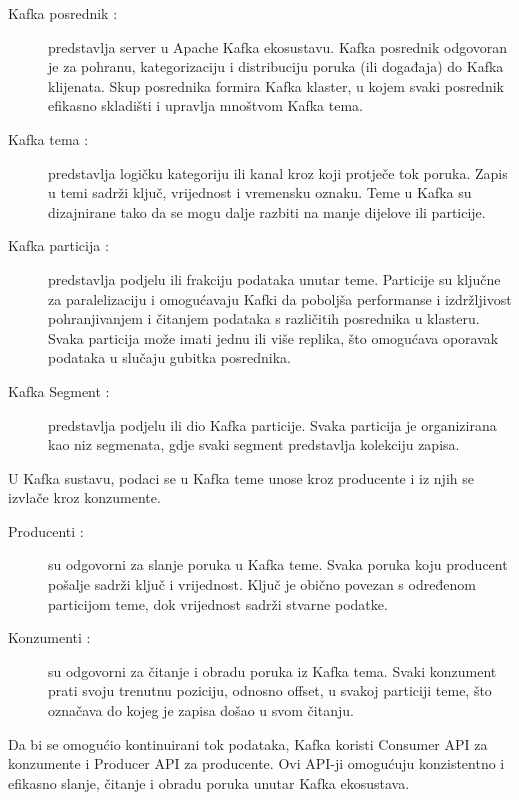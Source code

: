 \documentclass[times, utf8, diplomski]{fer}
\begin{document}
\begin{description}
	\item[Kafka posrednik  :] predstavlja server u Apache Kafka ekosustavu. Kafka posrednik odgovoran je za pohranu, kategorizaciju i distribuciju poruka (ili događaja) do Kafka klijenata. Skup posrednika formira Kafka klaster, u kojem svaki posrednik efikasno skladišti i upravlja mnoštvom Kafka tema.
	
	\item[Kafka tema  :] predstavlja logičku kategoriju ili kanal kroz koji protječe tok poruka. Zapis u temi sadrži ključ, vrijednost i vremensku oznaku. Teme u Kafka su dizajnirane tako da se mogu dalje razbiti na manje dijelove ili particije.
	
	\item[Kafka particija  :] predstavlja podjelu ili frakciju podataka unutar teme. Particije su ključne za paralelizaciju i omogućavaju Kafki da poboljša performanse i izdržljivost pohranjivanjem i čitanjem podataka s različitih posrednika u klasteru. Svaka particija može imati jednu ili više replika, što omogućava oporavak podataka u slučaju gubitka posrednika.
	
	\item[Kafka Segment :] predstavlja podjelu ili dio Kafka particije. Svaka particija je organizirana kao niz segmenata, gdje svaki segment predstavlja kolekciju zapisa.
\end{description}


U Kafka sustavu, podaci se u Kafka teme unose kroz producente i iz njih se izvlače kroz konzumente.

\begin{description}
	\item[Producenti  :] su odgovorni za slanje poruka u Kafka teme. Svaka poruka koju producent pošalje sadrži ključ i vrijednost. Ključ je obično povezan s određenom particijom teme, dok vrijednost sadrži stvarne podatke.
	
	\item[Konzumenti  :] su odgovorni za čitanje i obradu poruka iz Kafka tema. Svaki konzument prati svoju trenutnu poziciju, odnosno offset, u svakoj particiji teme, što označava do kojeg je zapisa došao u svom čitanju.
\end{description}

Da bi se omogućio kontinuirani tok podataka, Kafka koristi Consumer API za konzumente i Producer API za producente. Ovi API-ji omogućuju konzistentno i efikasno slanje, čitanje i obradu poruka unutar Kafka ekosustava.
\end{document}
